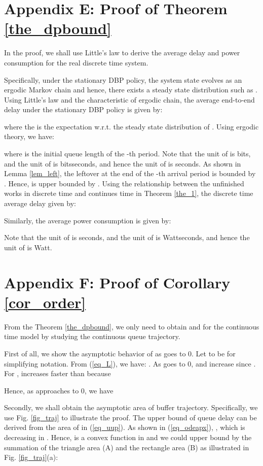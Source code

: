 \documentclass[11pt,journal, onecolumn]{./IEEEtran}
\newcommand{\red}{\color{black}}
\begin{document}
\section*{Appendix E: Proof of Theorem \ref{the_dpbound}}\label{app_dpbound}
{\red In the proof, we shall use Little's law \cite{Ross:2003} to derive the average delay and power consumption for the real discrete time system.}

Specifically, under the stationary DBP policy, the system state  evolves as an ergodic Markov chain and hence, there exists a steady state distribution  such as . Using Little's law and the characteristic of ergodic chain, the average end-to-end delay under the stationary DBP policy  is given by:

where the  is the expectation w.r.t. the steady state distribution of . Using ergodic theory, we have:

where  is the initial queue length of the -th period. {\red Note that the unit of  is bits, and the unit of  is bitsseconds, and hence the unit of  is seconds.} As shown in Lemma \ref{lem_left}, the leftover  at the end of the -th arrival period is bounded by . Hence,  is upper bounded by . Using the relationship between the unfinished works in discrete time and continues time in Theorem \ref{the_1}, the discrete time average delay given by:


Similarly, the average power consumption  is given by:

{\red Note that the unit of  is seconds, and the unit of  is Wattseconds, and hence the unit of  is Watt.}


\section*{Appendix F: Proof of Corollary \ref{cor_order}}\label{app_order}
{\red From the Theorem \ref{the_dpbound}, we only need to obtain  and  for the continuous time model by studying the continuous queue trajectory.}

{\red First of all, we show the asymptotic behavior of  as  goes to 0.} Let  to be  for simplifying  notation. From (\ref{eq_L}), we have: . As  goes to 0,  and  increase since . For ,  increases faster than  because

Hence, as  approaches to 0, we have 


{\red Secondly, we shall obtain the asymptotic area of buffer trajectory. Specifically, we use Fig. \ref{fig_traj} to illustrate the proof.} The upper bound of queue delay can be derived from the area of  in (\ref{eq_uup}). As shown in (\ref{eq_odeapx}), , which is decreasing in . Hence,  is a convex function in  and we could upper bound  by the summation of the triangle area (A) and the rectangle area (B) as illustrated in Fig. \ref{fig_traj}(a):
\end{document}
